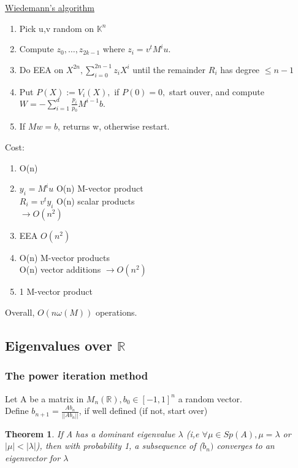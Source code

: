 \documentclass{article}
\newtheorem{theorem}{Theorem}
\theoremstyle{definition}
\theoremstyle{remark}
\newcommand{\R}{\mathbb{R}}
\newcommand{\K}{\mathbb{K}}
\begin{document}
\underline{Wiedemann's algorithm}
\begin{enumerate}
	\item Pick u,v random on $\K^n$
	\item Compute $z_0,\dots,z_{2k-1}$ where $z_i = v^tM^iu.$
	\item Do EEA on $X^{2n}, \sum_{i = 0}^{2n -1}z_i X^i$ until the remainder $R_i$ has degree $\leq n-1$
	\item Put $P(X) := V_i(X),$ if $P(0) = 0,$ start ouver, and compute $W = -\sum_{i = 1}^d \frac{p_i}{p_0} M^{i-1} b.$
	\item If $Mw = b$, returns w, otherwise restart.
\end{enumerate}
Cost:
\begin{enumerate}
	\item O(n)
	\item $y_i = M^iu$ O(n) M-vector product\\
	$R_i = v^ty_i$ O(n) scalar products\\
	$\rightarrow O(n^2)$
	\item EEA $O(n^2)$
	\item O(n) M-vector products\\
	O(n) vector additions
	$\rightarrow O(n^2)$
	\item 1 M-vector product
\end{enumerate}
Overall, $O(n\omega(M))$ operations.
\subsection{Eigenvalues over $\R$}
\subsubsection{The power iteration method}
Let A be a matrix in $M_n(\R), b_0 \in [-1,1]^n$ a random vector.\\
Define $b_{n+1} = \frac{A b_n}{||A b_n||}$, if well defined (if not, start over)

\begin{theorem}
	If A has a dominant eigenvalue $\lambda$ (i,e $\forall \mu \in Sp(A), \mu = \lambda$ or $ |\mu| < |\lambda|$), then with probability 1, a subsequence of ($b_n)$ converges to an eigenvector for $\lambda$
\end{theorem}
\end{document}
